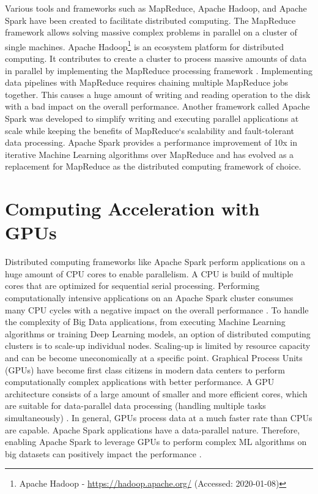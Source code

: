Various tools and frameworks such as MapReduce, Apache Hadoop, and Apache Spark have been created to facilitate distributed computing.
The MapReduce\cite{Dean2004MapReduce} framework allows solving massive complex problems in parallel on a cluster of single machines.
Apache Hadoop\footnote{Apache Hadoop - \url{https://hadoop.apache.org/} (Accessed: 2020-01-08)} is an ecosystem platform for distributed computing. It contributes to create a cluster to process massive amounts of data in parallel by implementing the MapReduce processing framework \cite{Khattak2016BigData}.
Implementing data pipelines with MapReduce requires chaining multiple MapReduce jobs together. This causes a huge amount of writing and reading operation to the disk with a bad impact on the overall performance. Another framework called Apache Spark was developed to simplify writing and executing parallel applications at scale while keeping the benefits of MapReduce`s scalability and fault-tolerant data processing. Apache Spark provides a performance improvement of 10x in iterative Machine Learning algorithms over MapReduce \cite{Zaharia2010Spark} and has evolved as a replacement for MapReduce as the distributed computing framework of choice.


\section{Computing Acceleration with GPUs}
Distributed computing frameworks like Apache Spark perform applications on a huge amount of CPU cores to enable parallelism. A CPU is build of multiple cores that are optimized for sequential serial processing. Performing computationally intensive applications on an Apache Spark cluster consumes many CPU cycles with a negative impact on the overall performance \cite{Li2015HeteroSpark}.
To handle the complexity of Big Data applications, from executing Machine Learning algorithms or training Deep Learning models, an option of distributed computing clusters is to scale-up individual nodes. Scaling-up is limited by resource capacity and can be become uneconomically at a specific point.
Graphical Process Units (GPUs) have become first class citizens in modern data centers to perform computationally complex applications with better performance. A GPU architecture consists of a large amount of smaller and more efficient cores, which are suitable for data-parallel data processing (handling multiple tasks simultaneously) \cite{Yuan2016SparkGPU}. In general, GPUs process data at a much faster rate than CPUs are capable.
Apache Spark applications have a data-parallel nature. Therefore, enabling Apache Spark to leverage GPUs to perform complex ML algorithms on big datasets can positively impact the performance \cite{Yuan2016SparkGPU}.


